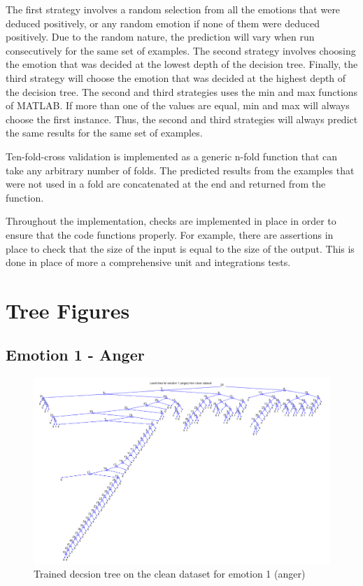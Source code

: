\documentclass[a4paper]{article}
\begin{document}
The first strategy involves a random selection from all the emotions that were deduced positively, or any random emotion if none of them were deduced positively. Due to the random nature, the prediction will vary when run consecutively for the same set of examples. The second strategy involves choosing the emotion that was decided at the lowest depth of the decision tree. Finally, the third strategy will choose the emotion that was decided at the highest depth of the decision tree. The second and third strategies uses the min and max functions of MATLAB. If more than one of the values are equal,  min and max will always choose the first instance. Thus, the second and third strategies will always predict the same results for the same set of examples.\medskip

Ten-fold-cross validation is implemented as a generic n-fold function that can take any arbitrary number of folds. The predicted results from the examples that were not used in a fold are concatenated at the end and returned from the function.\medskip

Throughout the implementation, checks are implemented in place in order to ensure that the code functions properly. For example, there are assertions in place to check that the size of the input is equal to the size of the output. This is done in place of more a comprehensive unit and integrations tests.

\clearpage


\section{Tree Figures}

\subsection{Emotion 1 - Anger}
\begin{figure}[H]
\center
\includegraphics[width=0.9\columnwidth]{AngerTree} %
\caption{Trained decsion tree on the clean dataset for emotion 1 (anger)}
\end{figure}
\end{document}

